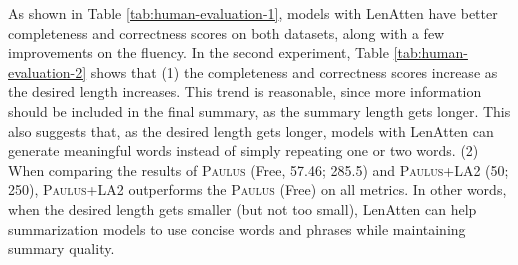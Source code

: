 \documentclass[11pt,a4paper]{article}
\begin{document}
\begin{table}[t]
\centering
\small
{}
\caption{Results of the second human evaluation. ``(Free, avg\_len)'': model generates summaries freely. The average length of the generated summaries is also listed.}
\label{tab:human-evaluation-2}
\end{table}

As shown in Table \ref{tab:human-evaluation-1}, models with LenAtten have better completeness and correctness scores on both datasets, along with a few improvements on the fluency. In the second experiment, Table \ref{tab:human-evaluation-2} shows that (1) the completeness and correctness scores increase as the desired length increases. This trend is reasonable, since more information should be included in the final summary, as the summary length gets longer. This also suggests that, as the desired length gets longer, models with LenAtten can generate meaningful words instead of simply repeating one or two words. (2) When comparing the results of \textsc{Paulus} (Free, 57.46; 285.5) and \textsc{Paulus+LA2} (50; 250), \textsc{Paulus+LA2} outperforms the \textsc{Paulus} (Free) on all metrics. In other words, when the desired length gets smaller (but not too small), LenAtten can help summarization models to use concise words and phrases while maintaining summary quality.
\end{document}

